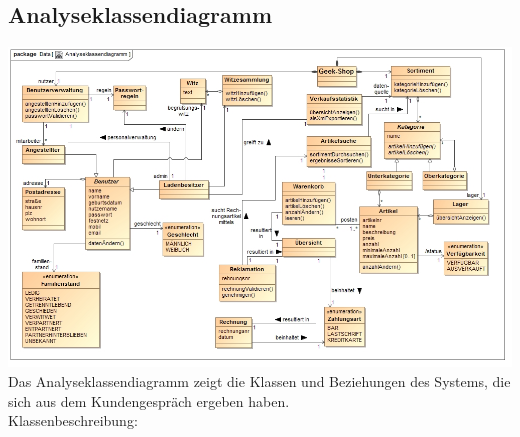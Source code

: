 \documentclass[pdftex,12pt,a4paper]{article}
\begin{document}
\subsection*{Analyseklassendiagramm}
\includegraphics[width=1\textwidth]{./images/analyseklassendiagramm}
Das Analyseklassendiagramm zeigt die Klassen und Beziehungen des Systems, die sich aus dem Kundengespr\"ach ergeben haben. \\
Klassenbeschreibung: \\
\end{document}
